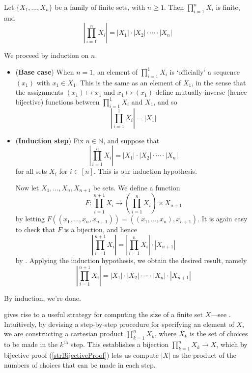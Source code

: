 \begin{lemma}
\label{lemMultiplicationPrincipleIndependent}
Let $\{ X_1, \dots, X_n \}$ be a family of finite sets, with $n \ge 1$. Then $\prod_{i=1}^n X_i$ is finite, and
\[ \left| \prod_{i=1}^n X_i \right| = |X_1| \cdot |X_2| \cdot \cdots \cdot |X_n| \]
\end{lemma}

\begin{cproof}
We proceed by induction on $n$.
\begin{itemize}
\item (\textbf{Base case}) When $n=1$, an element of $\prod_{i=1}^1 X_i$ is `officially' a sequence $(x_1)$ with $x_1 \in X_1$. This is the same as an element of $X_1$, in the sense that the assignments $(x_1) \mapsto x_1$ and $x_1 \mapsto (x_1)$ define mutually inverse (hence bijective) functions between $\prod_{i=1}^1 X_i$ and $X_1$, and so
\[ \left| \prod_{i=1}^1 X_i \right| = |X_1| \]
\item (\textbf{Induction step}) Fix $n \in \mathbb{N}$, and suppose that
\[ \displaystyle \left| \prod_{i=1}^n X_i \right| = |X_1| \cdot |X_2| \cdot \cdots \cdot |X_n| \]
for all sets $X_i$ for $i \in [n]$. This is our induction hypothesis.

Now let $X_1, \dots, X_n, X_{n+1}$ be sets. We define a function
\[ F : \prod_{i=1}^{n+1} X_i \to \left(\prod_{i=1}^n X_i\right) \times X_{n+1} \]
by letting $F((x_1, \dots, x_n, x_{n+1})) = ((x_1, \dots, x_n), x_{n+1})$. It is again easy to check that $F$ is a bijection, and hence
\[ \left| \prod_{i=1}^{n+1} X_i \right| = \left| \prod_{i=1}^n X_i \right| \cdot |X_{n+1}| \]
by . Applying the induction hypothesis, we obtain the desired result, namely
\[ \left| \prod_{i=1}^{n+1} X_i \right| = |X_1| \cdot |X_2| \cdot \cdots \cdot |X_n| \cdot |X_{n+1}| \]
\end{itemize}
By induction, we're done.
\end{cproof}

 gives rise to a useful strategy for computing the size of a finite set $X$---see . Intuitively, by devising a step-by-step procedure for specifying an element of $X$, we are constructing a cartesian product $\prod_{k=1}^n X_k$, where $X_k$ is the set of choices to be made in the $k^{\text{th}}$ step. This establishes a bijection $\prod_{k=1}^n X_k \to X$, which by bijective proof (\ref{strBijectiveProof}) lets us compute $|X|$ as the product of the numbers of choices that can be made in each step.

